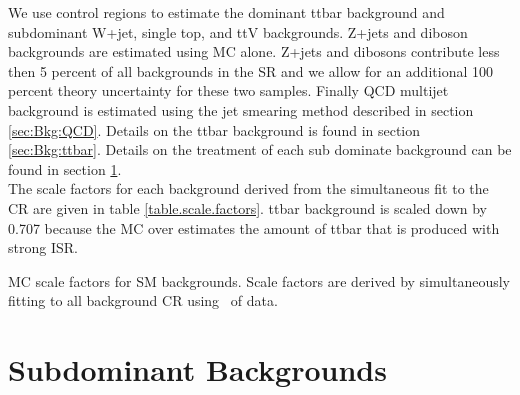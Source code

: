 

\indent We use control regions to estimate the dominant ttbar background and subdominant W+jet, single top, and ttV backgrounds.  Z+jets and diboson backgrounds are estimated using MC alone.  Z+jets and dibosons contribute less then 5 percent of all backgrounds in the SR and we allow for an additional 100 percent theory uncertainty for these two samples.   Finally QCD multijet background is estimated using the jet smearing method described in section \ref{sec:Bkg:QCD}. Details on the ttbar background is found in section \ref{sec:Bkg:ttbar}. Details on the treatment of each sub dominate background can be found in section \ref{sec:Bkg:sub}.\\

\indent The scale factors for each background derived from the simultaneous fit to the CR are given in table \ref{table.scale.factors}. ttbar background is scaled down by 0.707 because the MC over estimates the amount of ttbar that is produced with strong ISR. \\

\begin{table}
  \begin{center}
    
  \end{center}
  \caption{MC scale factors for SM backgrounds.  Scale factors are derived by simultaneously fitting to all background CR using \intlumi\ \ifb of data.}
  \label{table.scale.factors}
\end{table}



\section{Subdominant Backgrounds}
\label{sec:Bkg:sub}






